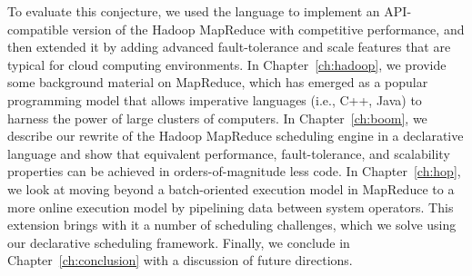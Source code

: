 To evaluate this conjecture, we used the \OVERLOG language to implement an
API-compatible version of the Hadoop MapReduce with competitive performance,
and then extended it by adding advanced fault-tolerance and scale features that
are typical for cloud computing environments.  In Chapter~\ref{ch:hadoop}, we
provide some background material on MapReduce, which has emerged as a popular
programming model that allows imperative languages (i.e., C++, Java) to harness
the power of large clusters of computers.  In Chapter~\ref{ch:boom}, we
describe our rewrite of the Hadoop MapReduce scheduling engine in a declarative
language and show that equivalent performance, fault-tolerance, and scalability
properties can be achieved in orders-of-magnitude less code.  In
Chapter~\ref{ch:hop}, we look at moving beyond a batch-oriented execution model
in MapReduce to a more online execution model by pipelining data between system
operators.  This extension brings with it a number of scheduling challenges,
which we solve using our declarative scheduling framework.  Finally, we
conclude in Chapter~\ref{ch:conclusion} with a discussion of future directions.





